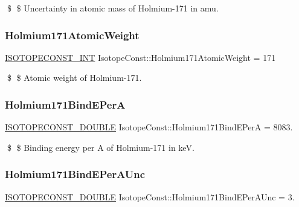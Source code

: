 \$ \$ Uncertainty in atomic mass of Holmium-\/171 in amu. \mbox{\label{group___isotope_const-_holmium-_ho171_gaf748a8f07a3e50aa8429fd11efa5b7d7}} 
\subsubsection{\texorpdfstring{Holmium171\+Atomic\+Weight}{Holmium171AtomicWeight}}
{\footnotesize\ttfamily \mbox{\hyperlink{group___isotope_const-_macros_ga5f18360b3e99483a35c32d789e62621c}{I\+S\+O\+T\+O\+P\+E\+C\+O\+N\+S\+T\+\_\+\+I\+NT}} Isotope\+Const\+::\+Holmium171\+Atomic\+Weight = 171}

\$ \$ Atomic weight of Holmium-\/171. \mbox{\label{group___isotope_const-_holmium-_ho171_gafcc25831e7e231dffed040611ecafea4}} 
\subsubsection{\texorpdfstring{Holmium171\+Bind\+E\+PerA}{Holmium171BindEPerA}}
{\footnotesize\ttfamily \mbox{\hyperlink{group___isotope_const-_macros_ga8f45a7272ce02c0b4c65c44636ed719a}{I\+S\+O\+T\+O\+P\+E\+C\+O\+N\+S\+T\+\_\+\+D\+O\+U\+B\+LE}} Isotope\+Const\+::\+Holmium171\+Bind\+E\+PerA = 8083.}

\$ \$ Binding energy per A of Holmium-\/171 in keV. \mbox{\label{group___isotope_const-_holmium-_ho171_ga8b6e8580617e870d7d683e432f0e71c9}} 
\subsubsection{\texorpdfstring{Holmium171\+Bind\+E\+Per\+A\+Unc}{Holmium171BindEPerAUnc}}
{\footnotesize\ttfamily \mbox{\hyperlink{group___isotope_const-_macros_ga8f45a7272ce02c0b4c65c44636ed719a}{I\+S\+O\+T\+O\+P\+E\+C\+O\+N\+S\+T\+\_\+\+D\+O\+U\+B\+LE}} Isotope\+Const\+::\+Holmium171\+Bind\+E\+Per\+A\+Unc = 3.}

